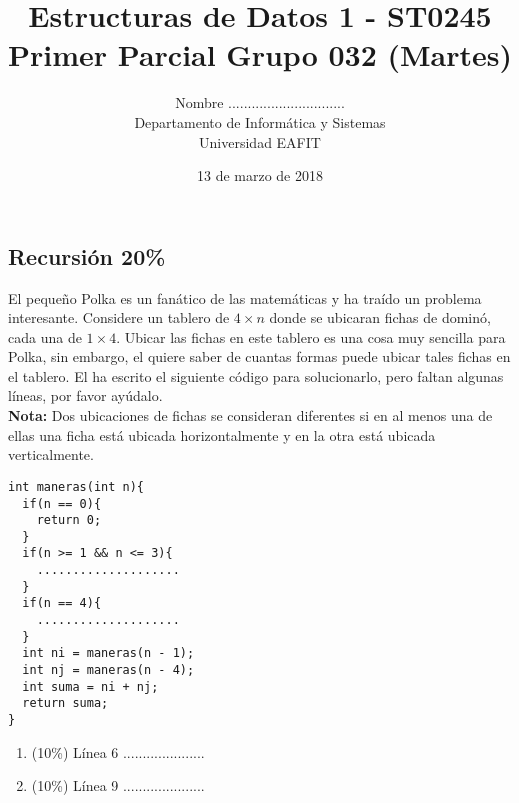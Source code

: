 \documentclass[10 pt]{article}
\title{\textbf {Estructuras de Datos 1 - ST0245\\Primer Parcial Grupo 032 (Martes)}}
\author{Nombre ..............................\\
		Departamento de Informática y Sistemas\\
		Universidad EAFIT\\}
\date{13 de marzo de 2018}
\begin{document}
\lstset{escapechar=@,style=customc, numbers=left, stepnumber = 1} 
\maketitle
\begin{multicols}{2}
\section{Recursión 20\%}
El pequeño Polka es un fanático de las matemáticas y ha traído un problema interesante. Considere un tablero de $4 \times n$ donde se ubicaran fichas de dominó, cada una de $1 \times 4$. Ubicar las fichas en este tablero es una cosa muy sencilla para Polka, sin embargo, el quiere saber de cuantas formas puede ubicar tales fichas en el tablero. El ha escrito el siguiente código para solucionarlo, pero faltan algunas líneas, por favor ayúdalo.
\\
\textbf{Nota: } Dos ubicaciones de fichas se consideran diferentes si en al menos una de ellas una ficha está ubicada horizontalmente y en la otra está ubicada verticalmente.
\begin{lstlisting}
int maneras(int n){
  if(n == 0){
	return 0;  
  }
  if(n >= 1 && n <= 3){
    ....................  
  }
  if(n == 4){
    ....................  
  }
  int ni = maneras(n - 1);
  int nj = maneras(n - 4);
  int suma = ni + nj;
  return suma;
}
\end{lstlisting}
\begin{enumerate}[label=\alph*]
\item (10\%) Línea 6 .....................
\item (10\%) Línea 9 .....................
\end{enumerate}

\end{multicols}
\end{document}
